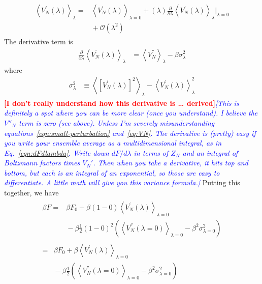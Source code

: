 \documentclass[letterpaper,twocolumn,amsmath,amssymb,prb]{revtex4-1}
\newcommand{\1}{\ensuremath{\textbf{r}_1}}
\newcommand{\2}{\ensuremath{\textbf{r}_2}}
\newcommand{\3}{\ensuremath{\textbf{r}_3}}
\newcommand{\4}{\ensuremath{\textbf{r}_4}}
\newcommand{\fixme}[1]{\textcolor{red}{\textbf{[#1]}}}
\newcommand{\davidsays}[1]{\textcolor{blue}{\textit{[#1]}}}
\begin{document}
\begin{align}\begin{split} %
  \left\langle V_N^{'}(\lambda) \right\rangle_\lambda = &{} \left\langle V_N^{'}(\lambda)\right\rangle_{\lambda = 0} + (\lambda)\frac{\partial}{\partial\lambda}\left\langle V_N^{'}(\lambda) \right\rangle_{\lambda}\bigg|_{\lambda = 0} \\ &{} + \mathcal{O}(\lambda^2)
\end{split}\end{align}
The derivative term is
\begin{align}
  \frac{\partial}{\partial\lambda}\left\langle V_N^{'}(\lambda) \right\rangle_{\lambda} &= \left\langle V_N^{''} \right\rangle_\lambda - \beta\sigma_\lambda^2
\end{align}
where
\begin{align}
  \sigma_\lambda^2 &\equiv \left\langle \left[ V_N^{'}(\lambda) \right]^2 \right\rangle_\lambda - \left\langle V_N^{'}(\lambda) \right\rangle^2_\lambda
\end{align}
\fixme{I don't really understand how this derivative is \ldots
  derived}\davidsays{This is definitely a spot where you can be more
  clear (once you understand).  I believe the $V''_N$ term is zero
  (see above).  Unless I'm severely misunderstanding
  equations~\ref{eqn:small-perturbation} and~\ref{eq:VN}.  The
  derivative is (pretty) easy if you write your ensemble average as a
  multidimensional integral, as in Eq.~\ref{eqn:dFdlambda}.  Write
  down $dF/d\lambda$ in terms of $Z_N$ and an integral of Boltzmann
  factors times $V_N'$.  Then when you take a derivative, it hits top
  and bottom, but each is an integral of an exponential, so those are
  easy to differentiate.  A little math will give you this variance
  formula.} Putting this together, we have
\begin{align}
  \begin{split}
    \beta F = &{} \beta F_0 + \beta(1 - 0)\left\langle V_N^{'}(\lambda) \right\rangle_{\lambda = 0} \\ &{} - \beta\frac{1}{2}(1 - 0)^2\left(\left\langle V_N^{''}(\lambda = 0) \right\rangle_{\lambda = 0} - \beta^2\sigma^2_{\lambda = 0} \right)
  \end{split} \\
  \begin{split}
    =&{}  \beta F_0 + \beta\left\langle V_N^{'}(\lambda) \right\rangle_{\lambda = 0} \\ &{} - \beta\frac{1}{2}\left(\left\langle V_N^{''}(\lambda = 0) \right\rangle_{\lambda = 0} - \beta^2\sigma^2_{\lambda = 0} \right) \label{eqn:complicated-HTE}
  \end{split}
\end{align}
\end{document}
